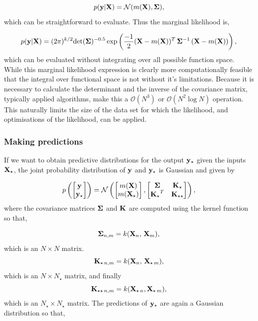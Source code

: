 \begin{equation}
p({\bf y} | {\bf X}) = \mathcal{N}(m({\bf X}), {\bf \Sigma}),
\end{equation}
which can be straightforward to evaluate. Thus the marginal likelihood is,

\begin{equation}
p({\bf y} | {\bf X}) = (2 \pi)^{k/2} {\rm det} ({\bf \Sigma})^{-0.5} \exp \left(\frac{-1}{2} ({\bf X} - m({\bf X}))^{T} \, {\bf \Sigma}^{-1} \, ({\bf X} - m({\bf X})) \right),
\end{equation}
which can be evaluated without integrating over all possible function space. While this marginal likelihood expression is clearly more computationally feasible that the integral over functional space is not without it's limitations.  Because it is necessary to calculate the determinant and the inverse of the covariance matrix, typically applied algorithms,  make this a $\mathcal{O}(N^3)$ or $\mathcal{O}(N^2 \log N)$ operation.  This naturally limits the size of the data set for which the likelihood,  and optimisations of the likelihood, can be applied.  

\subsubsection{Making predictions}
If we want to obtain predictive distributions for the output $\bf y_{\star}$ given the inputs $\bf X_{\star}$,  the joint probability distribution of $\bf y$ and $\bf y_{\star}$ is Gaussian and given by

\begin{equation}
p \left( \begin{bmatrix} {\bf y} \\ {\bf y_{\star}} \end{bmatrix} \right) = \mathcal{N} \left( \begin{bmatrix} m({\bf X}) \\ m({\bf X_{\star}}) \end{bmatrix} , \begin{bmatrix} {\bf \Sigma} & {\bf K_{\star} }\\ {\bf K_{\star}}^{T} & {\bf K_{\star \star}} \end{bmatrix}  \right), 
\end{equation}
where the covariance matrices $\bf \Sigma$ and $\bf K$ are computed using the kernel function so that,

\begin{equation}
{\bf \Sigma}_{n, m} = k({\bf X}_{n}, \, {\bf X}_{m}),
\end{equation}
which is an $N \times N$ matrix.
\begin{equation}
{\bf K}_{\star \, n, m} = k({\bf X}_{n}, \, { \bf X}_{\star \, m}),
\end{equation}
which is an $N \times N_{\star}$ matrix, and finally
\begin{equation}
{\bf K}_{\star \star \, n, m} = k({\bf X}_{\star \, n},  {\bf X}_{\star \,m}),
\end{equation}
which is an $N_{\star} \times N_{\star}$ matrix.
The predictions of $\bf y_{\star}$ are again a Gaussian distribution so that,

